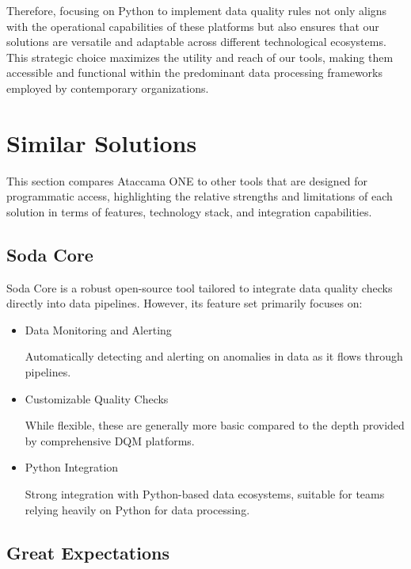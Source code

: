 Therefore, focusing on Python to implement data quality rules not only aligns with the operational capabilities of these platforms but also ensures that our solutions are versatile and adaptable across different technological ecosystems. This strategic choice maximizes the utility and reach of our  tools, making them accessible and functional within the predominant data processing frameworks employed by contemporary organizations.

\section{Similar Solutions}

This section compares Ataccama ONE to other  tools that are designed for programmatic access, highlighting the relative strengths and limitations of each solution in terms of features, technology stack, and integration capabilities.

\subsection{Soda Core}

Soda Core \cite{sodacore} is a robust open-source tool tailored to integrate data quality checks directly into data pipelines. However, its feature set primarily focuses on:

\begin{itemize}
    \item Data Monitoring and Alerting
    
    Automatically detecting and alerting on anomalies in data as it flows through pipelines.

    \item Customizable Quality Checks

    While flexible, these are generally more basic compared to the depth provided by comprehensive DQM platforms.

    \item Python Integration
    
    Strong integration with Python-based data ecosystems, suitable for teams relying heavily on Python for data processing.
\end{itemize}

\subsection{Great Expectations}

